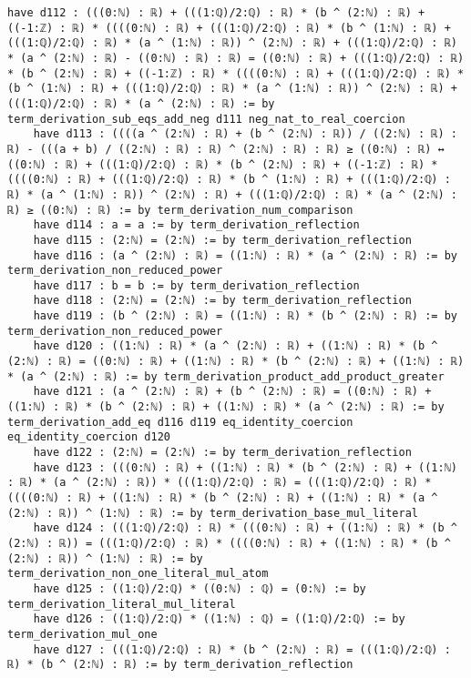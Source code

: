 \documentclass{article}
\begin{document}
\begin{tcolorbox}[colback=white!10, width=\linewidth]
\begin{lstlisting}[language=Lean4]
    have d112 : (((0:ℕ) : ℝ) + (((1:ℚ)/2:ℚ) : ℝ) * (b ^ (2:ℕ) : ℝ) + ((-1:ℤ) : ℝ) * ((((0:ℕ) : ℝ) + (((1:ℚ)/2:ℚ) : ℝ) * (b ^ (1:ℕ) : ℝ) + (((1:ℚ)/2:ℚ) : ℝ) * (a ^ (1:ℕ) : ℝ)) ^ (2:ℕ) : ℝ) + (((1:ℚ)/2:ℚ) : ℝ) * (a ^ (2:ℕ) : ℝ) - ((0:ℕ) : ℝ) : ℝ) = ((0:ℕ) : ℝ) + (((1:ℚ)/2:ℚ) : ℝ) * (b ^ (2:ℕ) : ℝ) + ((-1:ℤ) : ℝ) * ((((0:ℕ) : ℝ) + (((1:ℚ)/2:ℚ) : ℝ) * (b ^ (1:ℕ) : ℝ) + (((1:ℚ)/2:ℚ) : ℝ) * (a ^ (1:ℕ) : ℝ)) ^ (2:ℕ) : ℝ) + (((1:ℚ)/2:ℚ) : ℝ) * (a ^ (2:ℕ) : ℝ) := by term_derivation_sub_eqs_add_neg d111 neg_nat_to_real_coercion
    have d113 : ((((a ^ (2:ℕ) : ℝ) + (b ^ (2:ℕ) : ℝ)) / ((2:ℕ) : ℝ) : ℝ) - (((a + b) / ((2:ℕ) : ℝ) : ℝ) ^ (2:ℕ) : ℝ) : ℝ) ≥ ((0:ℕ) : ℝ) ↔ ((0:ℕ) : ℝ) + (((1:ℚ)/2:ℚ) : ℝ) * (b ^ (2:ℕ) : ℝ) + ((-1:ℤ) : ℝ) * ((((0:ℕ) : ℝ) + (((1:ℚ)/2:ℚ) : ℝ) * (b ^ (1:ℕ) : ℝ) + (((1:ℚ)/2:ℚ) : ℝ) * (a ^ (1:ℕ) : ℝ)) ^ (2:ℕ) : ℝ) + (((1:ℚ)/2:ℚ) : ℝ) * (a ^ (2:ℕ) : ℝ) ≥ ((0:ℕ) : ℝ) := by term_derivation_num_comparison
    have d114 : a = a := by term_derivation_reflection
    have d115 : (2:ℕ) = (2:ℕ) := by term_derivation_reflection
    have d116 : (a ^ (2:ℕ) : ℝ) = ((1:ℕ) : ℝ) * (a ^ (2:ℕ) : ℝ) := by term_derivation_non_reduced_power
    have d117 : b = b := by term_derivation_reflection
    have d118 : (2:ℕ) = (2:ℕ) := by term_derivation_reflection
    have d119 : (b ^ (2:ℕ) : ℝ) = ((1:ℕ) : ℝ) * (b ^ (2:ℕ) : ℝ) := by term_derivation_non_reduced_power
    have d120 : ((1:ℕ) : ℝ) * (a ^ (2:ℕ) : ℝ) + ((1:ℕ) : ℝ) * (b ^ (2:ℕ) : ℝ) = ((0:ℕ) : ℝ) + ((1:ℕ) : ℝ) * (b ^ (2:ℕ) : ℝ) + ((1:ℕ) : ℝ) * (a ^ (2:ℕ) : ℝ) := by term_derivation_product_add_product_greater
    have d121 : (a ^ (2:ℕ) : ℝ) + (b ^ (2:ℕ) : ℝ) = ((0:ℕ) : ℝ) + ((1:ℕ) : ℝ) * (b ^ (2:ℕ) : ℝ) + ((1:ℕ) : ℝ) * (a ^ (2:ℕ) : ℝ) := by term_derivation_add_eq d116 d119 eq_identity_coercion eq_identity_coercion d120
    have d122 : (2:ℕ) = (2:ℕ) := by term_derivation_reflection
    have d123 : (((0:ℕ) : ℝ) + ((1:ℕ) : ℝ) * (b ^ (2:ℕ) : ℝ) + ((1:ℕ) : ℝ) * (a ^ (2:ℕ) : ℝ)) * (((1:ℚ)/2:ℚ) : ℝ) = (((1:ℚ)/2:ℚ) : ℝ) * ((((0:ℕ) : ℝ) + ((1:ℕ) : ℝ) * (b ^ (2:ℕ) : ℝ) + ((1:ℕ) : ℝ) * (a ^ (2:ℕ) : ℝ)) ^ (1:ℕ) : ℝ) := by term_derivation_base_mul_literal
    have d124 : (((1:ℚ)/2:ℚ) : ℝ) * (((0:ℕ) : ℝ) + ((1:ℕ) : ℝ) * (b ^ (2:ℕ) : ℝ)) = (((1:ℚ)/2:ℚ) : ℝ) * ((((0:ℕ) : ℝ) + ((1:ℕ) : ℝ) * (b ^ (2:ℕ) : ℝ)) ^ (1:ℕ) : ℝ) := by term_derivation_non_one_literal_mul_atom
    have d125 : ((1:ℚ)/2:ℚ) * ((0:ℕ) : ℚ) = (0:ℕ) := by term_derivation_literal_mul_literal
    have d126 : ((1:ℚ)/2:ℚ) * ((1:ℕ) : ℚ) = ((1:ℚ)/2:ℚ) := by term_derivation_mul_one
    have d127 : (((1:ℚ)/2:ℚ) : ℝ) * (b ^ (2:ℕ) : ℝ) = (((1:ℚ)/2:ℚ) : ℝ) * (b ^ (2:ℕ) : ℝ) := by term_derivation_reflection

\end{lstlisting}
\end{tcolorbox}
\end{document}
